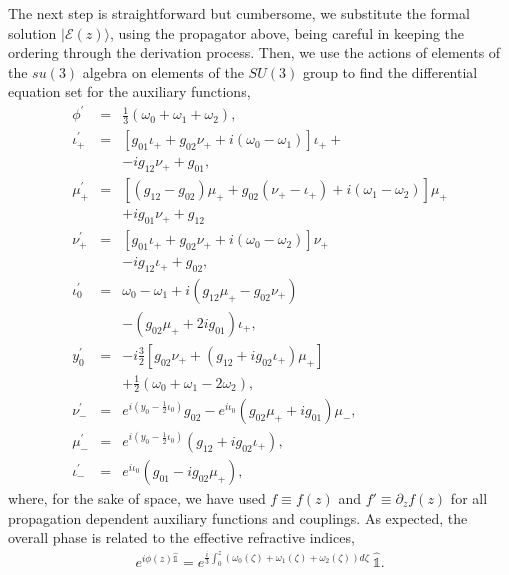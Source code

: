 \documentclass[9pt,twocolumn,twoside]{osajnl}
\begin{document}
The next step is straightforward but cumbersome, we substitute the formal solution $\vert \mathcal{E}(z) \rangle$, using the propagator above, being careful in keeping the ordering through the derivation process. 
Then, we use the actions of elements of the $su(3)$ algebra on elements of the $SU(3)$ group \cite{Nelson1967p857} to find the differential equation set for the auxiliary functions,
\begin{eqnarray}
	\phi ^{\prime} &=& \frac{1}{3}\left(\omega_{0} + \omega_{1} + \omega_{2} \right), \\
	\iota_{+}^{\prime} &=& \left[ g_{01} \iota_{+} + g_{02} \nu_{+} + i \left( \omega_{0} - \omega_{1} \right) \right] \iota_{+} + \nonumber \\
	&& - i  g_{12}   \nu_{+}  + g_{01}  ,    \label{eq:iota} \\
	\mu_{+}^{\prime} &=& \left[ \left( g_{12} - g_{02} \right) \mu_{+} + g_{02} \left( \nu_{+} - \iota_{+} \right)  + i \left( \omega_{1} - \omega_{2} \right)\right] \mu_{+} \nonumber \\
	&&  + i g_{01} \nu_{+} + g_{12}  \\
	\nu_{+}^{\prime} &=& \left[ g_{01} \iota_{+} + g_{02} \nu_{+} + i \left( \omega_{0} - \omega_{2} \right) \right] \nu_{+} \nonumber \\
	&& - i g_{12} \iota_{+} + g_{02}, \label{eq:mu} \\
	\iota_{0}^{\prime} &=&  \omega_{0} - \omega_{1} + i \left( g_{12} \mu_{+} - g_{02} \nu_{+} \right) \nonumber \\
	&& - \left( g_{02} \mu_{+} + 2 i g_{01} \right) \iota_{+}, \\
	y_{0}^{\prime} &=& -i\frac{3}{2}  
	[ g_{02}   \nu_{+} +    
	( g_{12}+i  g_{02} \iota_{+})\mu_{+}]\nonumber \\&&+\frac{1}{2}(\omega_0+\omega_1- 2 \omega_{2}),  \\
	\nu_{-}^{\prime} &=& e^{i  \left( y_0 - \frac{1}{2} \iota_0 \right)}
	g_{02} -  e^{i\iota_{0}}   \left( g_{02} \mu_{+} + i  g_{01} \right) \mu_{-} ,  \\
	\mu_{-}^{\prime} &=&  e^{i  \left( y_0 - \frac{1}{2} \iota_0 \right)}
	( g_{12}+i  g_{02} \iota_{+}),\\
	\iota_{-}^{\prime} &=& e^{i \iota_{0}} \left( g_{01} - i g_{02}\mu_{+} \right), 
\end{eqnarray}
where, for the sake of space, we have used $f \equiv f(z)$ and $f' \equiv \partial_{z} f(z)$ for all propagation dependent auxiliary functions and couplings.
As expected, the overall phase is related to the effective refractive indices, 
\begin{eqnarray}
e^{i \phi(z) \hat{\mathbb{1}}} = e^{\frac{i}{3} \int_{0}^{z} \left(\omega_{0}(\zeta) + \omega_{1}(\zeta) + \omega_{2}(\zeta) \right) d\zeta } ~\hat{\mathbb{1}} .
\end{eqnarray}
\end{document}
